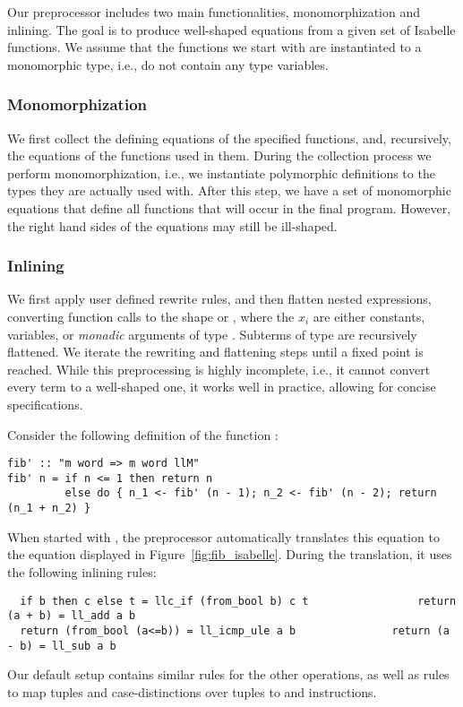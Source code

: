 \documentclass[a4paper,oribibl,envcountsame]{llncs}
\begin{document}
Our preprocessor includes two main functionalities, monomorphization and inlining.
The goal is to produce well-shaped equations from a given set of Isabelle functions.
We assume that the functions we start with are instantiated to a monomorphic type, i.e., do not contain any type variables.

\subsubsection{Monomorphization}
We first collect the defining equations of the specified functions, and, recursively, the equations of the functions used in them.
During the collection process we perform monomorphization, i.e., 
we instantiate polymorphic definitions to the types they are actually used with. 
After this step, we have a set of monomorphic equations that define all functions that will occur in the final program.
However, the right hand sides of the equations may still be ill-shaped.



\subsubsection{Inlining}
We first apply user defined rewrite rules, and then flatten nested expressions, converting function calls to the shape 
 or , where the $x_i$ are either constants, variables, or \emph{monadic} arguments
of type . Subterms of type  are recursively flattened.
We iterate the rewriting and flattening steps until a fixed point is reached. 
While this preprocessing is highly incomplete, i.e., it cannot convert every term to a well-shaped one, it works well in practice, allowing for concise specifications.

\begin{example}
Consider the following definition of the function :
\begin{lstlisting}
fib' :: "m word => m word llM"
fib' n = if n <= 1 then return n 
         else do { n_1 <- fib' (n - 1); n_2 <- fib' (n - 2); return (n_1 + n_2) }
\end{lstlisting}
When started with , the preprocessor automatically translates this equation 
to the equation displayed in Figure~\ref{fig:fib_isabelle}. During the translation, it uses the following inlining rules:
\begin{lstlisting}
  if b then c else t = llc_if (from_bool b) c t                 return (a + b) = ll_add a b
  return (from_bool (a<=b)) = ll_icmp_ule a b               return (a - b) = ll_sub a b
\end{lstlisting}
Our default setup contains similar rules for the other operations, as well as rules to map tuples and case-distinctions over tuples to  and  instructions.
\end{example}
\end{document}
